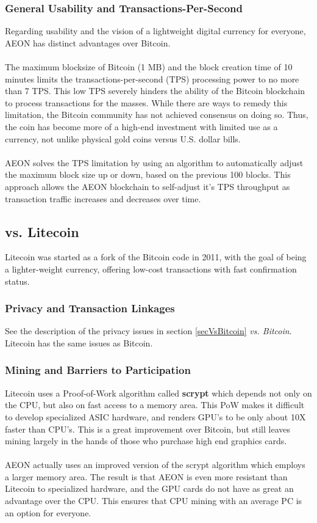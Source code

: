 \subsubsection{General Usability and Transactions-Per-Second}
Regarding usability and the vision of a lightweight digital currency for everyone, AEON has distinct advantages over Bitcoin.\\
\\
The maximum blocksize of Bitcoin (1 MB) and the block creation time of 10 minutes limits the transactions-per-second (TPS) processing power to no more than 7 TPS.  This low TPS severely hinders the ability of the Bitcoin blockchain to process transactions for the masses.  While there are ways to remedy this limitation, the Bitcoin community has not achieved consensus on doing so.  Thus, the coin has become more of a high-end investment with limited use as a currency, not unlike physical gold coins versus U.S. dollar bills.\\
\\
AEON solves the TPS limitation by using an algorithm to automatically adjust the maximum block size up or down, based on the previous 100 blocks. This approach allows the AEON blockchain to self-adjust it's TPS throughput as transaction traffic increases and decreases over time.

\subsection{vs. Litecoin}
Litecoin was started as a fork of the Bitcoin code in 2011, with the goal of being a lighter-weight currency, offering low-cost transactions with fast confirmation status.

\subsubsection{Privacy and Transaction Linkages}
See the description of the privacy issues in section \ref{secVsBitcoin} \textit{vs. Bitcoin}. Litecoin has the same issues as Bitcoin.

\subsubsection{Mining and Barriers to Participation}
Litecoin uses a Proof-of-Work algorithm called \textbf{scrypt} which depends not only on the CPU, but also on fast access to a memory area.  This PoW makes it difficult to develop specialized ASIC hardware, and renders GPU's to be only about 10X faster than CPU's.  This is a great improvement over Bitcoin, but still leaves mining largely in the hands of those who purchase high end graphics cards.\\
\\
AEON actually uses an improved version of the scrypt algorithm which employs a larger memory area. The result is that AEON is even more resistant than Litecoin to specialized hardware, and the GPU cards do not have as great an advantage over the CPU.  This ensures that CPU mining with an average PC is an option for everyone.

